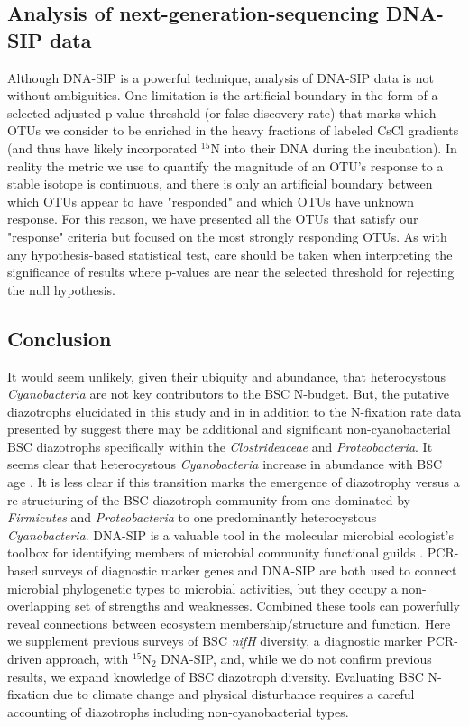 \subsection{Analysis of next-generation-sequencing DNA-SIP data} Although
DNA-SIP is a powerful technique, analysis of DNA-SIP data is not without
ambiguities. One limitation is the artificial boundary in the form of a
selected adjusted p-value threshold (or false discovery rate) that marks
which OTUs we consider to be enriched in the heavy fractions of labeled CsCl
gradients (and thus have likely incorporated $^{15}$N into their DNA during
the incubation). In reality the metric we use to quantify the magnitude of an
OTU's response to a stable isotope is continuous, and there is only an
artificial boundary between which OTUs appear to have "responded" and which
OTUs have unknown response. For this reason, we have presented all the OTUs
that satisfy our "response" criteria but focused on the most strongly
responding OTUs. As with any hypothesis-based statistical test, care should
be taken when interpreting the significance of results where p-values are
near the selected threshold for rejecting the null hypothesis.

\subsection{Conclusion}
It would seem unlikely, given their ubiquity and abundance, that
heterocystous \textit{Cyanobacteria} are not key contributors to the BSC
N-budget. But, the putative diazotrophs elucidated in this study and in
\citet{Steppe_1996} in addition to the N-fixation rate data presented by
\citep{15643930} suggest there may be additional and significant
non-cyanobacterial BSC diazotrophs specifically within the
\textit{Clostrideaceae} and \textit{Proteobacteria}. It seems clear that
heterocystous \textit{Cyanobacteria} increase in abundance with BSC age
\citep{14766579}. It is less clear if this transition marks the emergence of
diazotrophy versus a re-structuring of the BSC diazotroph community from one
dominated by \textit{Firmicutes} and \textit{Proteobacteria} to one
predominantly heterocystous \textit{Cyanobacteria}. DNA-SIP is a valuable tool in the
molecular microbial ecologist's toolbox for identifying members of microbial
community functional guilds \citep{17446886}. PCR-based surveys of diagnostic
marker genes and DNA-SIP are both used to connect microbial phylogenetic
types to microbial activities, but they occupy a non-overlapping set of
strengths and weaknesses.  Combined these tools can powerfully reveal
connections between ecosystem membership/structure and function. Here we
supplement previous surveys of BSC \textit{nifH} diversity, a diagnostic
marker PCR-driven approach, with $^{15}$N$_{2}$ DNA-SIP, and, while we do not
confirm previous results, we expand knowledge of BSC diazotroph diversity.
Evaluating BSC N-fixation due to climate change and physical disturbance
requires a careful accounting of diazotrophs including non-cyanobacterial
types. 

